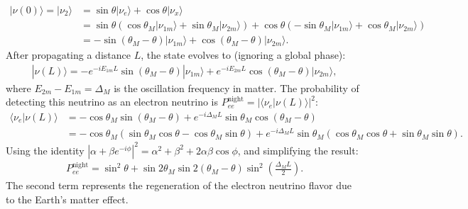 \begin{align}
    |\nu(0)\rangle = |\nu_2\rangle &= \sin\theta |\nu_e\rangle + \cos\theta |\nu_x\rangle \nonumber \\
    &= \sin\theta (\cos\theta_M |\nu_{1m}\rangle + \sin\theta_M |\nu_{2m}\rangle) + \cos\theta (-\sin\theta_M |\nu_{1m}\rangle + \cos\theta_M |\nu_{2m}\rangle) \nonumber \\
    &= -\sin(\theta_M - \theta) |\nu_{1m}\rangle + \cos(\theta_M - \theta) |\nu_{2m}\rangle.
\end{align}
After propagating a distance $L$, the state evolves to (ignoring a global phase):
\begin{align}
    |\nu(L)\rangle = -e^{-i E_{1m} L} \sin(\theta_M - \theta) |\nu_{1m}\rangle + e^{-i E_{2m} L} \cos(\theta_M - \theta) |\nu_{2m}\rangle,
\end{align}
where $E_{2m} - E_{1m} = \Delta_M$ is the oscillation frequency in matter. The probability of detecting this neutrino as an electron neutrino is $P_{ee}^{\text{night}} = |\langle \nu_e | \nu(L) \rangle|^2$:
\begin{align}
    \langle \nu_e | \nu(L) \rangle &= -\cos\theta_M \sin(\theta_M - \theta) + e^{-i \Delta_M L} \sin\theta_M \cos(\theta_M - \theta) \nonumber \\
    &= -\cos\theta_M (\sin\theta_M \cos\theta - \cos\theta_M \sin\theta) + e^{-i \Delta_M L} \sin\theta_M (\cos\theta_M \cos\theta + \sin\theta_M \sin\theta).
\end{align}
Using the identity $|\alpha + \beta e^{-i\phi}|^2 = \alpha^2 + \beta^2 + 2\alpha\beta\cos\phi$, and simplifying the result:
\begin{align}
    P_{ee}^{\text{night}} = \sin^2\theta + \sin 2\theta_M \sin 2(\theta_M - \theta) \sin^2\left( \frac{\Delta_M L}{2} \right).
\end{align}
The second term represents the regeneration of the electron neutrino flavor due to the Earth's matter effect.

